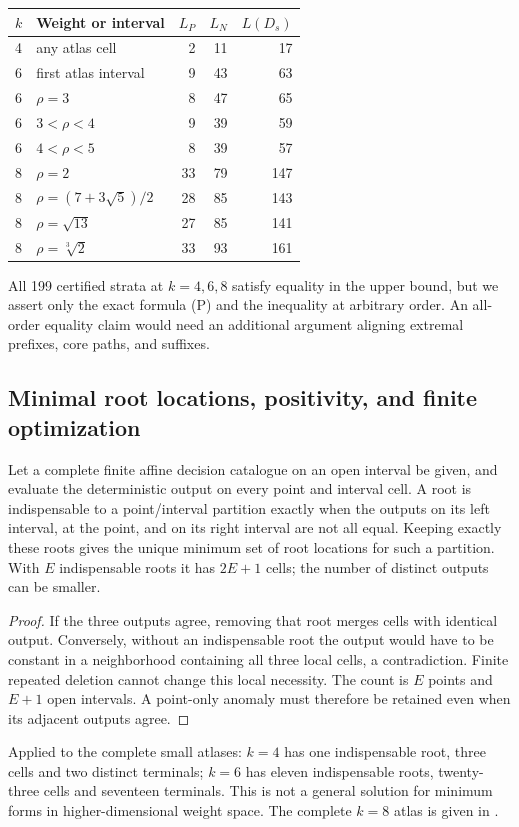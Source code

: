 \begin{center}\begin{tabular}{llrrr}\toprule
$k$ & Weight or interval & $L_P$ & $L_N$ & $L(D_s)$\\\midrule
4 & any atlas cell &2&11&17\\
6 & first atlas interval &9&43&63\\
6 & $\rho=3$ &8&47&65\\
6 & $3<\rho<4$ &9&39&59\\
6 & $4<\rho<5$ &8&39&57\\
8 & $\rho=2$ &33&79&147\\
8 & $\rho=(7+3\sqrt5)/2$ &28&85&143\\
8 & $\rho=\sqrt{13}$ &27&85&141\\
8 & $\rho=\sqrt[3]{2}$ &33&93&161\\\bottomrule
\end{tabular}\end{center}
All 199 certified strata at $k=4,6,8$ satisfy equality in the upper bound, but we assert only the exact formula (P) and the inequality at arbitrary order. An all-order equality claim would need an additional argument aligning extremal prefixes, core paths, and suffixes.

\subsection{Minimal root locations, positivity, and finite optimization}\label{ext:sec:remaining}
\begin{proposition}
Let a complete finite affine decision catalogue on an open interval be given, and evaluate the deterministic output on every point and interval cell. A root is indispensable to a point/interval partition exactly when the outputs on its left interval, at the point, and on its right interval are not all equal. Keeping exactly these roots gives the unique minimum set of root locations for such a partition. With $E$ indispensable roots it has $2E+1$ cells; the number of distinct outputs can be smaller.
\end{proposition}
\begin{proof}
If the three outputs agree, removing that root merges cells with identical output. Conversely, without an indispensable root the output would have to be constant in a neighborhood containing all three local cells, a contradiction. Finite repeated deletion cannot change this local necessity. The count is $E$ points and $E+1$ open intervals. A point-only anomaly must therefore be retained even when its adjacent outputs agree.
\end{proof}
Applied to the complete small atlases: $k=4$ has one indispensable root, three cells and two distinct terminals; $k=6$ has eleven indispensable roots, twenty-three cells and seventeen terminals. This is not a general solution for minimum forms in higher-dimensional weight space. The complete $k=8$ atlas is given in .


